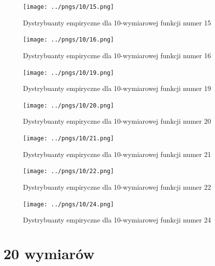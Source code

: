 \documentclass[a4paper,onecolumn,oneside,12pt,wide,floatssmall]{mwrep}
\theoremstyle{definition}
\theoremstyle{plain}%
\theoremstyle{remark}
\begin{document}
\begin{figure}[H]
\centering
\texttt{[image: ../pngs/10/15.png]}
\caption{Dystrybuanty empiryczne dla 10-wymiarowej funkcji numer 15}
\end{figure}

\begin{figure}[H]
\centering
\texttt{[image: ../pngs/10/16.png]} 
\caption{Dystrybuanty empiryczne dla 10-wymiarowej funkcji numer 16}
\end{figure}

\begin{figure}[H]
\centering
\texttt{[image: ../pngs/10/19.png]}
\caption{Dystrybuanty empiryczne dla 10-wymiarowej funkcji numer 19}
\end{figure}

\begin{figure}[H]
\centering
\texttt{[image: ../pngs/10/20.png]}
\caption{Dystrybuanty empiryczne dla 10-wymiarowej funkcji numer 20}
\end{figure}

\begin{figure}[H]
\centering
\texttt{[image: ../pngs/10/21.png]}
\caption{Dystrybuanty empiryczne dla 10-wymiarowej funkcji numer 21}
\end{figure}

\begin{figure}[H]
\centering
\texttt{[image: ../pngs/10/22.png]}
\caption{Dystrybuanty empiryczne dla 10-wymiarowej funkcji numer 22}
\end{figure}

\begin{figure}[H]
\centering
\texttt{[image: ../pngs/10/24.png]}
\caption{Dystrybuanty empiryczne dla 10-wymiarowej funkcji numer 24}
\end{figure}

\section{20 wymiarów}
\end{document}
